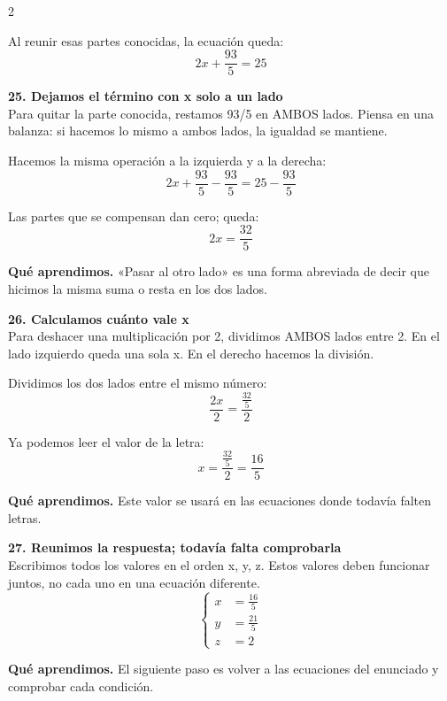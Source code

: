 \documentclass[11pt,a4paper,landscape]{article}
\begin{document}
\begin{multicols*}{2}
\begin{minipage}{\linewidth}
\par\smallskip Al reunir esas partes conocidas, la ecuación queda:
\[2x + \frac{93}{5}=25\]
\end{minipage}\par\medskip
\noindent\begin{minipage}{\linewidth}\textbf{25. Dejamos el término con x solo a un lado}\\[2pt]Para quitar la parte conocida, restamos 93/5 en AMBOS lados. Piensa en una balanza: si hacemos lo mismo a ambos lados, la igualdad se mantiene.
\par\smallskip Hacemos la misma operación a la izquierda y a la derecha:
\[2x + \frac{93}{5} - \frac{93}{5}=25 - \frac{93}{5}\]
\par\smallskip Las partes que se compensan dan cero; queda:
\[2x=\frac{32}{5}\]
\par\smallskip\textbf{Qué aprendimos.} «Pasar al otro lado» es una forma abreviada de decir que hicimos la misma suma o resta en los dos lados.
\end{minipage}\par\medskip
\noindent\begin{minipage}{\linewidth}\textbf{26. Calculamos cuánto vale x}\\[2pt]Para deshacer una multiplicación por 2, dividimos AMBOS lados entre 2. En el lado izquierdo queda una sola x. En el derecho hacemos la división.
\par\smallskip Dividimos los dos lados entre el mismo número:
\[\frac{2x}{2}=\frac{\frac{32}{5}}{2}\]
\par\smallskip Ya podemos leer el valor de la letra:
\[x=\frac{\frac{32}{5}}{2}=\frac{16}{5}\]
\par\smallskip\textbf{Qué aprendimos.} Este valor se usará en las ecuaciones donde todavía falten letras.
\end{minipage}\par\medskip
\noindent\begin{minipage}{\linewidth}\textbf{27. Reunimos la respuesta; todavía falta comprobarla}\\[2pt]Escribimos todos los valores en el orden x, y, z. Estos valores deben funcionar juntos, no cada uno en una ecuación diferente.
\[\left\{\begin{aligned}x&=\frac{16}{5}\\y&=\frac{21}{5}\\z&=2\end{aligned}\right.\]
\par\smallskip\textbf{Qué aprendimos.} El siguiente paso es volver a las ecuaciones del enunciado y comprobar cada condición.

\end{minipage}
\end{multicols*}
\end{document}
